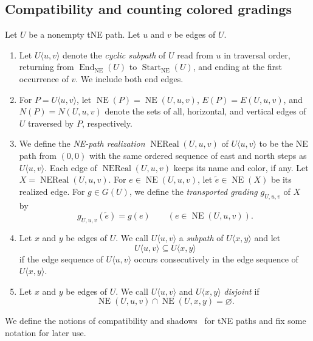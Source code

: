 \subsection{Compatibility and counting colored gradings}



\begin{definition}\label{def:cyclic-subpaths}
Let $U$ be a nonempty tNE path. Let $u$ and $v$ be edges of $U$.
\begin{enumerate}[font=\itshape]
\item Let $U\langle u,v\rangle$ denote the \textit{cyclic subpath} of $U$
read from $u$ in traversal order, returning from $\operatorname{End}_{\mathrm{NE}}(U)$
to $\operatorname{Start}_{\mathrm{NE}}(U)$,
and ending at the first occurrence of $v$. We include both end edges.
\item For $P=U\langle u,v\rangle$, let
$\operatorname{NE}(P)=\operatorname{NE}(U,u,v)$, $E(P)=E(U,u,v)$, and $N(P)=N(U,u,v)$
denote the sets of all, horizontal, and vertical edges of $U$ traversed by $P$, respectively.
\item We define the \textit{NE-path realization}
$\operatorname{NEReal}(U,u,v)$ of $U\langle u,v\rangle$ to be the NE path from $(0,0)$
with the same ordered sequence of east and north steps as $U\langle u,v\rangle$.
Each edge of $\operatorname{NEReal}(U,u,v)$ keeps its name and color, if any.
Let $X=\operatorname{NEReal}(U,u,v)$.
For $e\in\operatorname{NE}(U,u,v)$, let $\widetilde e\in\operatorname{NE}(X)$ be its realized edge.
For $g\in G(U)$, we define the \textit{transported grading} $g_{U,u,v}$ of $X$ by
\[
 g_{U,u,v}(\widetilde e)=g(e)\qquad(e\in\operatorname{NE}(U,u,v)).
\]
\item Let $x$ and $y$ be edges of $U$. We call $U\langle u,v\rangle$ a \textit{subpath} of $U\langle x,y\rangle$ and let
\[
 U\langle u,v\rangle\subseteq U\langle x,y\rangle
\]
if the edge sequence of $U\langle u,v\rangle$ occurs consecutively in the edge sequence of $U\langle x,y\rangle$.
\item Let $x$ and $y$ be edges of $U$. We call $U\langle u,v\rangle$ and $U\langle x,y\rangle$
\textit{disjoint} if
\[
 \operatorname{NE}(U,u,v)\cap\operatorname{NE}(U,x,y)=\varnothing.
\]
\end{enumerate}
\end{definition}

We define the notions of compatibility and shadows~\cite{B}
for tNE paths and fix some notation for later use.

